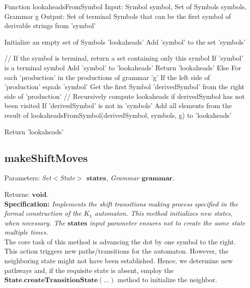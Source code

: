 \begin{codeblock}
    Function lookaheadsFromSymbol
    Input: Symbol symbol, Set of Symbols symbols, Grammar g
    Output: Set of terminal Symbols that can be the first symbol of derivable strings from 'symbol'

    Initialize an empty set of Symbols 'lookaheads'
    Add 'symbol' to the set 'symbols'

    // If the symbol is terminal, return a set containing only this symbol
    If 'symbol' is a terminal symbol
    Add 'symbol' to 'lookaheads'
    Return 'lookaheads'
    Else
    For each 'production' in the productions of grammar 'g'
    If the left side of 'production' equals 'symbol'
    Get the first Symbol 'derivedSymbol' from the right side of 'production'
    // Recursively compute lookaheads if derivedSymbol has not been visited
    If 'derivedSymbol' is not in 'symbols'
    Add all elements from the result of lookaheadsFromSymbol(derivedSymbol, symbols, g) to 'lookaheads'

    Return 'lookaheads'
\end{codeblock}

\vspace{30pt}

\subsection{makeShiftMoves}

Parameters: \textit{Set\(<\)State\(>\) \(\boldsymbol{states}\), Grammar \(\boldsymbol{grammar}\).}

Returns: \textit{\(\boldsymbol{void}\).}\\

\textbf{Specification:} \textit{Implements the shift transitions making process specified in the formal construction of the \({K_{1}}\) automaton. This method initializes new states, when necessary. The \(\boldsymbol{states}\) input parameter ensures not to create the same state multiple times.}\\

The core task of this method is advancing the dot by one symbol to the right. This action triggers new paths/transitions for the automaton. However, the neighboring state might not have been established. Hence, we determine new pathways and, if the requisite state is absent, employ the \(\boldsymbol{State.createTransitionState(...)}\) method to initialize the neighbor.\\

